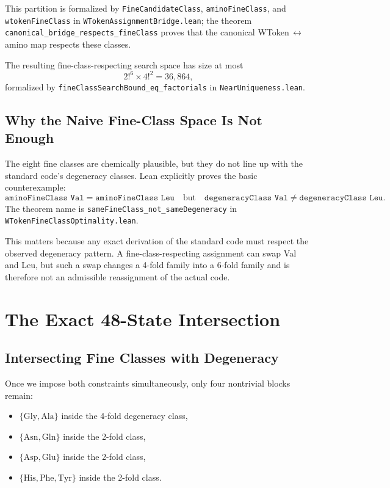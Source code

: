 \documentclass[11pt,twocolumn]{article}
\begin{document}
This partition is formalized by \texttt{FineCandidateClass},
\texttt{aminoFineClass}, and \texttt{wtokenFineClass} in
\texttt{WTokenAssignmentBridge.lean}; the theorem
\texttt{canonical\_bridge\_respects\_fineClass} proves that the canonical
WToken$\,\leftrightarrow\,$amino map respects these classes.

The resulting fine-class-respecting search space has size at most
\[
2!^6 \times 4!^2 = 36{,}864,
\]
formalized by \texttt{fineClassSearchBound\_eq\_factorials} in
\texttt{NearUniqueness.lean}.

\subsection{Why the Naive Fine-Class Space Is Not Enough}

The eight fine classes are chemically plausible, but they do not line up
with the standard code's degeneracy classes. Lean explicitly proves the
basic counterexample:
\[
\texttt{aminoFineClass Val} = \texttt{aminoFineClass Leu}
\quad\text{but}\quad
\texttt{degeneracyClass Val} \neq \texttt{degeneracyClass Leu}.
\]
The theorem name is
\texttt{sameFineClass\_not\_sameDegeneracy} in
\texttt{WTokenFineClassOptimality.lean}.

This matters because any exact derivation of the standard code must respect
the observed degeneracy pattern. A fine-class-respecting assignment can swap
Val and Leu, but such a swap changes a 4-fold family into a 6-fold family
and is therefore not an admissible reassignment of the actual code.

\section{The Exact 48-State Intersection}

\subsection{Intersecting Fine Classes with Degeneracy}

Once we impose both constraints simultaneously, only four nontrivial blocks
remain:
\begin{itemize}
\item $\{\mathrm{Gly}, \mathrm{Ala}\}$ inside the 4-fold degeneracy class,
\item $\{\mathrm{Asn}, \mathrm{Gln}\}$ inside the 2-fold class,
\item $\{\mathrm{Asp}, \mathrm{Glu}\}$ inside the 2-fold class,
\item $\{\mathrm{His}, \mathrm{Phe}, \mathrm{Tyr}\}$ inside the 2-fold class.
\end{itemize}
\end{document}
